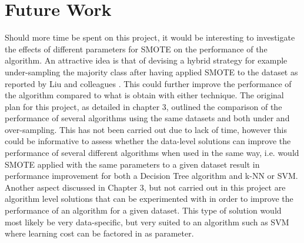 \section{Future Work}
Should more time be spent on this project, it would be interesting to investigate the effects of different parameters for SMOTE on the performance of the algorithm.
An attractive idea is that of devising a hybrid strategy for example under-sampling the majority class after having applied SMOTE to the dataset as reported by Liu and colleagues \citep{Liu:wl}. This could further improve the performance of the algorithm compared to what is obtain with either technique.\newline
The original plan for this project, as detailed in chapter 3, outlined the comparison of the performance of several algorithms using the same datasets and both under and over-sampling. This has not been carried out due to lack of time, however this could be informative to assess whether the data-level solutions can improve the performance of several different algorithms when used in the same way, i.e. would SMOTE applied with the same parameters to a given dataset result in performance improvement for both a Decision Tree algorithm and k-NN or SVM.\newline
Another aspect discussed in Chapter 3, but not carried out in this project are algorithm level solutions that can be experimented with in order to improve the performance of an algorithm for a given dataset. This type of solution would most likely be very data-specific, but very suited to an algorithm such as SVM where learning cost can be factored in as parameter.

